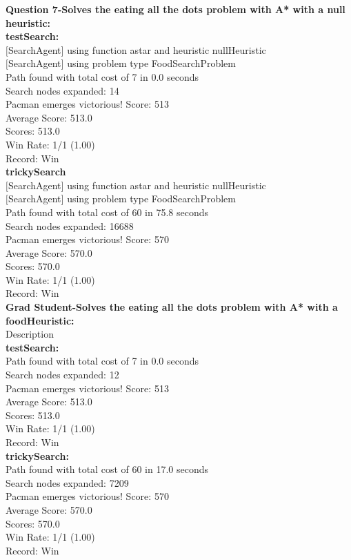 \documentclass[11pt]{article}
\begin{document}
\newpage
\noindent
\textbf{Question 7-Solves the eating all the dots problem with A* with a null heuristic:}\\
\textbf{testSearch:}\\
$[$SearchAgent$]$ using function astar and heuristic nullHeuristic\\
$[$SearchAgent$]$ using problem type FoodSearchProblem\\
Path found with total cost of 7 in 0.0 seconds\\
Search nodes expanded: 14\\
Pacman emerges victorious! Score: 513\\
Average Score: 513.0\\
Scores:        513.0\\
Win Rate:      1/1 (1.00)\\
Record:        Win\\

\noindent
\textbf{trickySearch}\\
$[$SearchAgent$]$ using function astar and heuristic nullHeuristic\\
$[$SearchAgent$]$ using problem type FoodSearchProblem\\
Path found with total cost of 60 in 75.8 seconds\\
Search nodes expanded: 16688\\
Pacman emerges victorious! Score: 570\\
Average Score: 570.0\\
Scores:        570.0\\
Win Rate:      1/1 (1.00)\\
Record:        Win\\

\newpage
\noindent
\textbf{Grad Student-Solves the eating all the dots problem with A* with a foodHeuristic:}\\
Description\\



\noindent
\textbf{testSearch:}\\
Path found with total cost of 7 in 0.0 seconds\\
Search nodes expanded: 12\\
Pacman emerges victorious! Score: 513\\
Average Score: 513.0\\
Scores:        513.0\\
Win Rate:      1/1 (1.00)\\
Record:        Win\\

\noindent
\textbf{trickySearch:}\\
Path found with total cost of 60 in 17.0 seconds\\
Search nodes expanded: 7209\\
Pacman emerges victorious! Score: 570\\
Average Score: 570.0\\
Scores:        570.0\\
Win Rate:      1/1 (1.00)\\
Record:        Win\\
\end{document}
